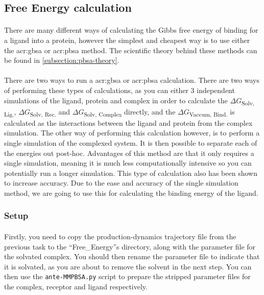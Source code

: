 \subsection{Free Energy calculation}
    \paragraph{}
    There are many different ways of calculating the Gibbs free energy of binding for a ligand into a protein, however the simplest and cheapest way is to use either the \gls{acr:gbsa} or \gls{acr:pbsa} method. The scientific theory behind these methods can be found in \cref{subsection:pbsa-theory}.

    \paragraph{}
    There are two ways to run a \gls{acr:gbsa}  or \gls{acr:pbsa} calculation. There are two ways of performing these types of calculations, as you can either 3 independent simulations of the ligand, protein and complex in order to calculate the $\Delta G$\textsubscript{Solv, Lig.}, $\Delta G$\textsubscript{Solv, Rec.} and $\Delta G$\textsubscript{Solv, Complex} directly, and the $\Delta G$\textsubscript{Vaccum, Bind.} is calculated as the interactions between the ligand and protein from the complex simulation. The other way of performing this calculation however, is to perform a single simulation of the complexed system. It is then possible to separate each of the energies out post-hoc. Advantages of this method are that it only requires a single simulation, meaning it is much less computationally intensive so you can potentially run a longer simulation. This type of calculation also has been shown to increase accuracy. Due to the ease and accuracy of the single simulation method, we are going to use this for calculating the binding energy of the ligand. 

    \subsubsection{Setup}
    \paragraph{}
    Firstly, you need to copy the production-dynamics trajectory file from the previous task to the \enquote{Free\_Energy}s directory, along with the parameter file for the solvated complex. You should then rename the parameter file to indicate that it is solvated, as you are about to remove the solvent in the next step. You can then use the \texttt{ante-MMPBSA.py} script to prepare the stripped parameter files for the complex, receptor and ligand respectively. 
    
